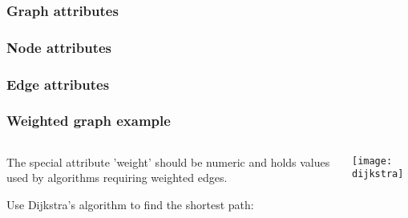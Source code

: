 \documentclass[xcolor=dvipsnames, 9pt]{beamer}
\begin{document}
\begin{frame}[fragile]
\frametitle{Graph attributes}


\end{frame}



\begin{frame}[fragile]
\frametitle{Node attributes}


\end{frame}

\begin{frame}[fragile]
\frametitle{Edge attributes}


\end{frame}

\begin{frame}[fragile]
\frametitle{Weighted graph example}
\begin{columns}
\begin{column}{0.7\textwidth}
The special attribute 'weight'
should be numeric and holds values used by algorithms requiring weighted edges.

Use Dijkstra's algorithm to find the shortest path:

\end{column}

\begin{column}{0.3\textwidth}
\centerline{\texttt{[image: dijkstra]}}
\end{column}
\end{columns}

\begin{block}{}

\end{block}

\end{frame}
\end{document}
